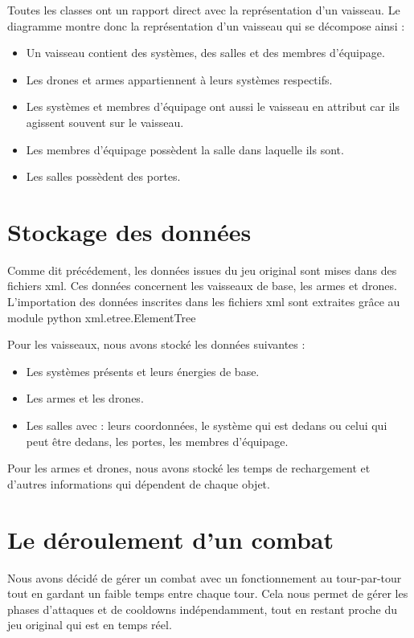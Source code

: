 	Toutes les classes ont un rapport direct avec la représentation d'un vaisseau. Le diagramme montre donc la représentation d'un vaisseau qui se décompose ainsi :\\
	\begin{itemize}
	\item Un vaisseau contient des systèmes, des salles et des membres d'équipage. 
	\item Les drones et armes appartiennent à leurs systèmes respectifs.
	\item Les systèmes et membres d'équipage ont aussi le vaisseau en attribut car ils agissent souvent sur le vaisseau.
	\item Les membres d'équipage possèdent la salle dans laquelle ils sont.
	\item Les salles possèdent des portes.
	\end{itemize}


\section{Stockage des données}

	Comme dit précédement, les données issues du jeu original sont mises dans des fichiers xml.	Ces données concernent les vaisseaux de base, les armes et drones.\\
	
	L'importation des données inscrites dans les fichiers xml sont extraites grâce au module python xml.etree.ElementTree
	
	Pour les vaisseaux, nous avons stocké les données suivantes :
	\begin{itemize}
		\item Les systèmes présents et leurs énergies de base.
		\item Les armes et les drones.
		\item Les salles avec : leurs coordonnées, le système qui est dedans ou celui qui peut être dedans, les portes, les membres d'équipage.
	\end{itemize}
	Pour les armes et drones, nous avons stocké les temps de rechargement et d'autres informations qui dépendent de chaque objet.
	

\section{Le déroulement d'un combat}

Nous avons décidé de gérer un combat avec un fonctionnement au tour-par-tour tout en gardant un faible temps entre chaque tour. 
Cela nous permet de gérer les phases d'attaques et de cooldowns indépendamment, tout en restant proche du jeu original qui est en temps réel.	

